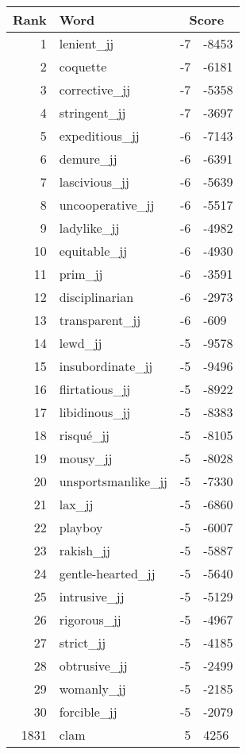 \begin{longtable}[!htbp]{| rlr@{.}l |}
    \hline
    \textbf{Rank} & \textbf{Word} & \multicolumn{2}{c|}{\textbf{Score}} \\
    \hline
    \endhead
    1 & lenient\_jj & -7 & -8453 \\
    2 & coquette & -7 & -6181 \\
    3 & corrective\_jj & -7 & -5358 \\
    4 & stringent\_jj & -7 & -3697 \\
    5 & expeditious\_jj & -6 & -7143 \\
    6 & demure\_jj & -6 & -6391 \\
    7 & lascivious\_jj & -6 & -5639 \\
    8 & uncooperative\_jj & -6 & -5517 \\
    9 & ladylike\_jj & -6 & -4982 \\
    10 & equitable\_jj & -6 & -4930 \\
    11 & prim\_jj & -6 & -3591 \\
    12 & disciplinarian & -6 & -2973 \\
    13 & transparent\_jj & -6 & -609 \\
    14 & lewd\_jj & -5 & -9578 \\
    15 & insubordinate\_jj & -5 & -9496 \\
    16 & flirtatious\_jj & -5 & -8922 \\
    17 & libidinous\_jj & -5 & -8383 \\
    18 & risqué\_jj & -5 & -8105 \\
    19 & mousy\_jj & -5 & -8028 \\
    20 & unsportsmanlike\_jj & -5 & -7330 \\
    21 & lax\_jj & -5 & -6860 \\
    22 & playboy & -5 & -6007 \\
    23 & rakish\_jj & -5 & -5887 \\
    24 & gentle-hearted\_jj & -5 & -5640 \\
    25 & intrusive\_jj & -5 & -5129 \\
    26 & rigorous\_jj & -5 & -4967 \\
    27 & strict\_jj & -5 & -4185 \\
    28 & obtrusive\_jj & -5 & -2499 \\
    29 & womanly\_jj & -5 & -2185 \\
    30 & forcible\_jj & -5 & -2079 \\
    1831 & clam & 5 & 4256 \\

\end{longtable}
